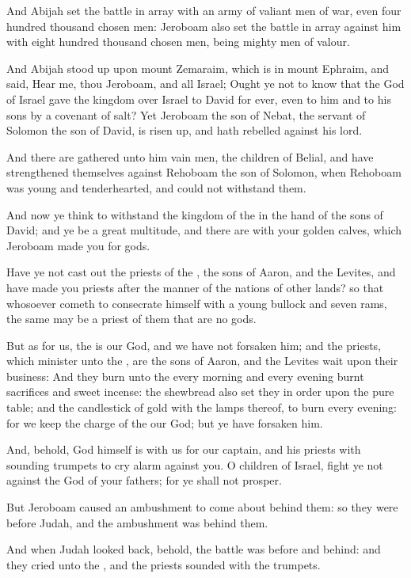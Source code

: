 \Verse And Abijah set the battle in array with an army of valiant men of war, even four hundred thousand chosen men: Jeroboam also set the battle in array against him with eight hundred thousand chosen men, being mighty men of valour.

\Verse And Abijah stood up upon mount Zemaraim, which is in mount Ephraim, and said, Hear me, thou Jeroboam, and all Israel; \Verse Ought ye not to know that the \LORD God of Israel gave the kingdom over Israel to David for ever, even to him and to his sons by a covenant of salt?  \Verse Yet Jeroboam the son of Nebat, the servant of Solomon the son of David, is risen up, and hath rebelled against his lord.

\Verse And there are gathered unto him vain men, the children of Belial, and have strengthened themselves against Rehoboam the son of Solomon, when Rehoboam was young and tenderhearted, and could not withstand them.

\Verse And now ye think to withstand the kingdom of the \LORD in the hand of the sons of David; and ye be a great multitude, and there are with your golden calves, which Jeroboam made you for gods.

\Verse Have ye not cast out the priests of the \LORD, the sons of Aaron, and the Levites, and have made you priests after the manner of the nations of other lands? so that whosoever cometh to consecrate himself with a young bullock and seven rams, the same may be a priest of them that are no gods.

\Verse But as for us, the \LORD is our God, and we have not forsaken him; and the priests, which minister unto the \LORD, are the sons of Aaron, and the Levites wait upon their business: \Verse And they burn unto the \LORD every morning and every evening burnt sacrifices and sweet incense: the shewbread also set they in order upon the pure table; and the candlestick of gold with the lamps thereof, to burn every evening: for we keep the charge of the \LORD our God; but ye have forsaken him.

\Verse And, behold, God himself is with us for our captain, and his priests with sounding trumpets to cry alarm against you. O children of Israel, fight ye not against the \LORD God of your fathers; for ye shall not prosper.

\Verse But Jeroboam caused an ambushment to come about behind them: so they were before Judah, and the ambushment was behind them.

\Verse And when Judah looked back, behold, the battle was before and behind: and they cried unto the \LORD, and the priests sounded with the trumpets.

